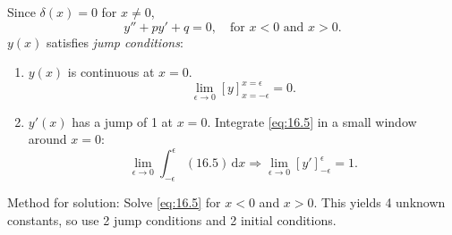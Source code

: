 \documentclass[a4paper]{article}
\begin{document}
      Since $\delta(x)=0$ for $x\neq 0$, 
      \[
          y''+py'+q=0, \quad \text{for }x< 0 \text{ and }x>0
      .\]
      $y(x)$ satisfies \textit{jump conditions}: 
      \begin{enumerate}
          \item $y(x)$ is continuous at $x=0$.
          \[
              \lim_{\epsilon \to 0} [y]_{x=-\epsilon}^{x=\epsilon}=0
          .\]
          \item $y'(x)$ has a jump of 1 at $x=0$. Integrate \ref{eq:16.5} in a small window around $x=0$:
          \[
              \lim_{\epsilon \to 0} \int_{-\epsilon}^{\epsilon} (16.5) \,\mathrm{d}x \Longrightarrow \lim_{\epsilon \to 0} [y']_{-\epsilon}^{\epsilon} = 1
          .\]
      \end{enumerate}
      Method for solution: Solve \ref{eq:16.5} for $ x<0 $ and $x>0$. This yields 4 unknown constants, so use 2 jump conditions and 2 initial conditions.
\end{document}
